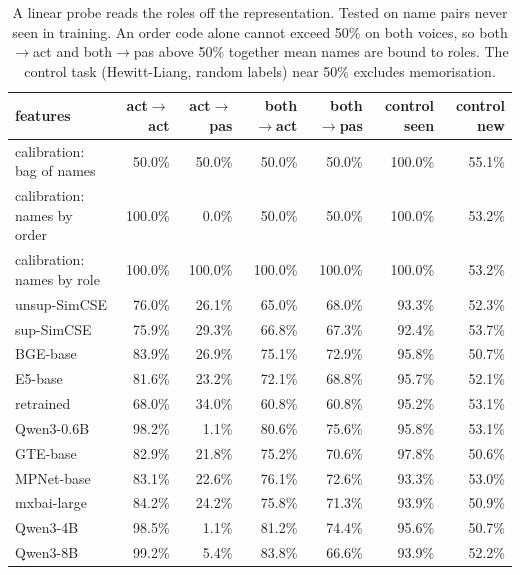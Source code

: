 \begin{table}[t]
\centering
\small
\caption{A linear probe reads the roles off the representation. Tested on name pairs never seen in training. An order code alone cannot exceed 50\% on both voices, so both$\rightarrow$act and both$\rightarrow$pas above 50\% together mean names are bound to roles. The control task (Hewitt-Liang, random labels) near 50\% excludes memorisation.}
\begin{tabular}{lrrrrrr}
\toprule
features & act$\rightarrow$act & act$\rightarrow$pas & both$\rightarrow$act & both$\rightarrow$pas & control seen & control new \\
\midrule
calibration: bag of names & 50.0\% & 50.0\% & 50.0\% & 50.0\% & 100.0\% & 55.1\% \\
calibration: names by order & 100.0\% & 0.0\% & 50.0\% & 50.0\% & 100.0\% & 53.2\% \\
calibration: names by role & 100.0\% & 100.0\% & 100.0\% & 100.0\% & 100.0\% & 53.2\% \\
unsup-SimCSE & 76.0\% & 26.1\% & 65.0\% & 68.0\% & 93.3\% & 52.3\% \\
sup-SimCSE & 75.9\% & 29.3\% & 66.8\% & 67.3\% & 92.4\% & 53.7\% \\
BGE-base & 83.9\% & 26.9\% & 75.1\% & 72.9\% & 95.8\% & 50.7\% \\
E5-base & 81.6\% & 23.2\% & 72.1\% & 68.8\% & 95.7\% & 52.1\% \\
retrained & 68.0\% & 34.0\% & 60.8\% & 60.8\% & 95.2\% & 53.1\% \\
Qwen3-0.6B & 98.2\% & 1.1\% & 80.6\% & 75.6\% & 95.8\% & 53.1\% \\
GTE-base & 82.9\% & 21.8\% & 75.2\% & 70.6\% & 97.8\% & 50.6\% \\
MPNet-base & 83.1\% & 22.6\% & 76.1\% & 72.6\% & 93.3\% & 53.0\% \\
mxbai-large & 84.2\% & 24.2\% & 75.8\% & 71.3\% & 93.9\% & 50.9\% \\
Qwen3-4B & 98.5\% & 1.1\% & 81.2\% & 74.4\% & 95.6\% & 50.7\% \\
Qwen3-8B & 99.2\% & 5.4\% & 83.8\% & 66.6\% & 93.9\% & 52.2\% \\
\bottomrule
\end{tabular}
\end{table}
